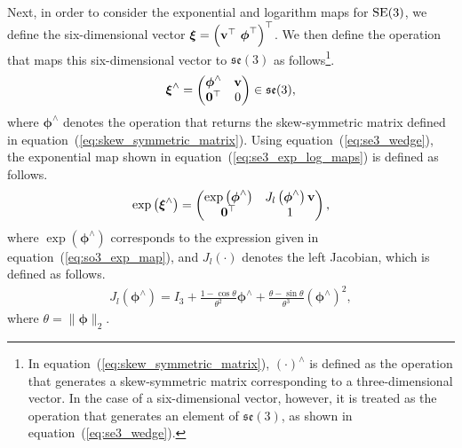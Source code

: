 Next, in order to consider the exponential and logarithm maps for ${\rm SE}(3)$, we define the six-dimensional vector $\boldsymbol{\xi} = \left( {\bf v}^{\top} ~ \boldsymbol{\phi}^{\top} \right)^{\top}$.
We then define the operation that maps this six-dimensional vector to $\mathfrak{se}(3)$ as follows\footnote{In equation~(\ref{eq:skew_symmetric_matrix}), $\left( \cdot \right)^{\wedge}$ is defined as the operation that generates a skew-symmetric matrix corresponding to a three-dimensional vector. In the case of a six-dimensional vector, however, it is treated as the operation that generates an element of $\mathfrak{se}(3)$, as shown in equation~(\ref{eq:se3_wedge}).}.
%
\begin{align}
  \boldsymbol \xi^{\wedge} = \left( \begin{matrix}
    \boldsymbol \phi^{\wedge} & {\bf v} \\
    {\bf 0}^{\top}            & 0
  \end{matrix} \right) \in \mathfrak{se}(3),
  \label{eq:se3_wedge}
\end{align}
%
where $\boldsymbol{\phi}^{\wedge}$ denotes the operation that returns the skew-symmetric matrix defined in equation~(\ref{eq:skew_symmetric_matrix}).
Using equation~(\ref{eq:se3_wedge}), the exponential map shown in equation~(\ref{eq:se3_exp_log_maps}) is defined as follows.
%
\begin{align}
  \exp \left( \boldsymbol \xi^{\wedge} \right) = \left( \begin{matrix}
    \exp \left( \boldsymbol \phi^{\wedge} \right) & J_{l} \left( \boldsymbol \phi^{\wedge} \right) {\bf v} \\
    {\bf 0}^{\top}                                & 1
  \end{matrix} \right),
  \label{eq:se3_exp_map}
\end{align}
%
where $\exp\left( \boldsymbol{\phi}^{\wedge} \right)$ corresponds to the expression given in equation~(\ref{eq:so3_exp_map}), and $J_{l}(\cdot)$ denotes the left Jacobian, which is defined as follows.
%
\begin{align}
  J_{l} \left( \boldsymbol \phi^{\wedge} \right)
  =
  I_{3} +
  \frac{ 1 - \cos \theta }{ \theta^{2} } \boldsymbol \phi^{\wedge} +
  \frac{ \theta - \sin \theta }{ \theta^{3} } \left( \boldsymbol \phi^{\wedge} \right)^{2},
  \label{eq:so3_left_jacobian}
\end{align}
%
where $\theta = \| \boldsymbol{\phi} \|_{2}$.

